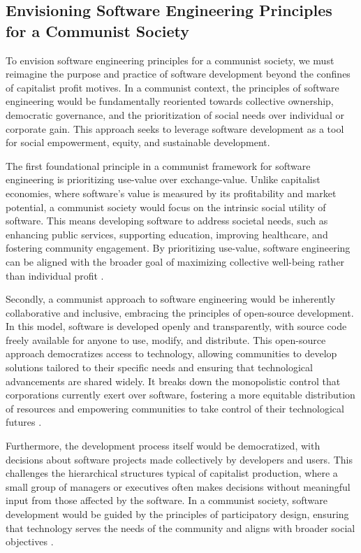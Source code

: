 \begin{refsection}
\subsection{Envisioning Software Engineering Principles for a Communist Society}

To envision software engineering principles for a communist society, we must reimagine the purpose and practice of software development beyond the confines of capitalist profit motives. In a communist context, the principles of software engineering would be fundamentally reoriented towards collective ownership, democratic governance, and the prioritization of social needs over individual or corporate gain. This approach seeks to leverage software development as a tool for social empowerment, equity, and sustainable development.

The first foundational principle in a communist framework for software engineering is prioritizing use-value over exchange-value. Unlike capitalist economies, where software's value is measured by its profitability and market potential, a communist society would focus on the intrinsic social utility of software. This means developing software to address societal needs, such as enhancing public services, supporting education, improving healthcare, and fostering community engagement. By prioritizing use-value, software engineering can be aligned with the broader goal of maximizing collective well-being rather than individual profit \cite[pp.~132-137]{marx1844Manuscripts2018}.

Secondly, a communist approach to software engineering would be inherently collaborative and inclusive, embracing the principles of open-source development. In this model, software is developed openly and transparently, with source code freely available for anyone to use, modify, and distribute. This open-source approach democratizes access to technology, allowing communities to develop solutions tailored to their specific needs and ensuring that technological advancements are shared widely. It breaks down the monopolistic control that corporations currently exert over software, fostering a more equitable distribution of resources and empowering communities to take control of their technological futures \cite[pp.~203-207]{stallmanFreeSoftware2010}.

Furthermore, the development process itself would be democratized, with decisions about software projects made collectively by developers and users. This challenges the hierarchical structures typical of capitalist production, where a small group of managers or executives often makes decisions without meaningful input from those affected by the software. In a communist society, software development would be guided by the principles of participatory design, ensuring that technology serves the needs of the community and aligns with broader social objectives \cite[pp.~52-55]{freirePedagogy2021}.


\end{refsection}
